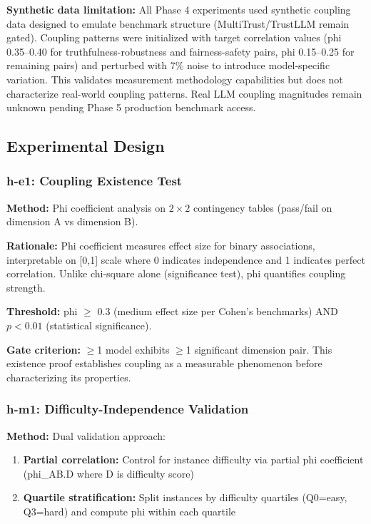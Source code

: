 \textbf{Synthetic data limitation:} All Phase 4 experiments used synthetic coupling data designed to emulate benchmark structure (MultiTrust/TrustLLM remain gated). Coupling patterns were initialized with target correlation values (phi 0.35--0.40 for truthfulness-robustness and fairness-safety pairs, phi 0.15--0.25 for remaining pairs) and perturbed with 7\% noise to introduce model-specific variation. This validates measurement methodology capabilities but does not characterize real-world coupling patterns. Real LLM coupling magnitudes remain unknown pending Phase 5 production benchmark access.

\subsection{Experimental Design}

\subsubsection{h-e1: Coupling Existence Test}

\textbf{Method:} Phi coefficient analysis on $2\times2$ contingency tables (pass/fail on dimension A vs dimension B).

\textbf{Rationale:} Phi coefficient measures effect size for binary associations, interpretable on [0,1] scale where 0 indicates independence and 1 indicates perfect correlation. Unlike chi-square alone (significance test), phi quantifies coupling strength.

\textbf{Threshold:} phi $\geq$ 0.3 (medium effect size per Cohen's benchmarks) AND $p < 0.01$ (statistical significance).

\textbf{Gate criterion:} $\geq$1 model exhibits $\geq$1 significant dimension pair. This existence proof establishes coupling as a measurable phenomenon before characterizing its properties.

\subsubsection{h-m1: Difficulty-Independence Validation}

\textbf{Method:} Dual validation approach:
\begin{enumerate}
\item \textbf{Partial correlation:} Control for instance difficulty via partial phi coefficient (phi\_AB.D where D is difficulty score)
\item \textbf{Quartile stratification:} Split instances by difficulty quartiles (Q0=easy, Q3=hard) and compute phi within each quartile
\end{enumerate}

